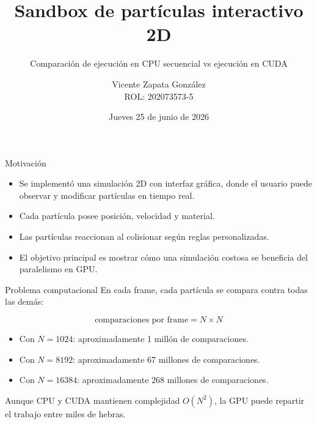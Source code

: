 \documentclass[aspectratio=169]{beamer}
\title[Sandbox de Partículas 2D]{Sandbox de partículas interactivo 2D}
\subtitle{Comparación de ejecución en CPU secuencial vs ejecución en CUDA}
\author[Vicente Zapata González]{Vicente Zapata González\\ROL: 202073573-5}
\institute[]{
    (ILI257) Programación Paralela Aplicada\\
    Profesor: Jorge Díaz Matte
}
\date{Jueves 25 de junio de 2026}
\begin{document}
\begin{frame}
    \titlepage
\end{frame}

\begin{frame}{Motivación}
    \begin{itemize}
        \item Se implementó una simulación 2D con interfaz gráfica, donde el usuario puede observar y modificar partículas en tiempo real.
        \item Cada partícula posee posición, velocidad y material.
        \item Las partículas reaccionan al colisionar según reglas personalizadas.
        \item El objetivo principal es mostrar cómo una simulación costosa se beneficia del paralelismo en GPU.
    \end{itemize}
\end{frame}

\begin{frame}{Problema computacional}
    En cada frame, cada partícula se compara contra todas las demás:

    \[
        \text{comparaciones por frame} = N \times N
    \]

    \vspace{0.4cm}

    \begin{itemize}
        \item Con $N = 1024$: aproximadamente 1 millón de comparaciones.
        \item Con $N = 8192$: aproximadamente 67 millones de comparaciones.
        \item Con $N = 16384$: aproximadamente 268 millones de comparaciones.
    \end{itemize}

    \vspace{0.3cm}

    Aunque CPU y CUDA mantienen complejidad $O(N^2)$, la GPU puede repartir el trabajo entre miles de hebras.
\end{frame}
\end{document}
